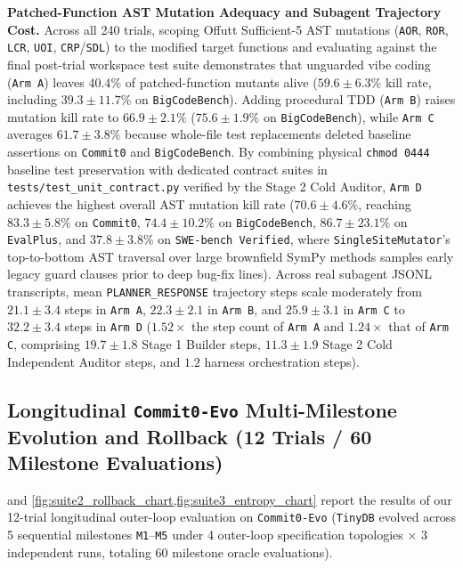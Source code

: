 \documentclass[11pt,a4paper,copyright]{google}
\begin{document}
\textbf{Patched-Function AST Mutation Adequacy and Subagent Trajectory Cost.} Across all 240 trials, scoping Offutt Sufficient-5 AST mutations (\texttt{AOR}, \texttt{ROR}, \texttt{LCR}, \texttt{UOI}, \texttt{CRP}/\texttt{SDL}) to the modified target functions and evaluating against the final post-trial workspace test suite demonstrates that unguarded vibe coding (\texttt{Arm A}) leaves $40.4\%$ of patched-function mutants alive ($59.6 \pm 6.3\%$ kill rate, including $39.3 \pm 11.7\%$ on \texttt{BigCodeBench}). Adding procedural TDD (\texttt{Arm B}) raises mutation kill rate to $66.9 \pm 2.1\%$ ($75.6 \pm 1.9\%$ on \texttt{BigCodeBench}), while \texttt{Arm C} averages $61.7 \pm 3.8\%$ because whole-file test replacements deleted baseline assertions on \texttt{Commit0} and \texttt{BigCodeBench}. By combining physical \texttt{chmod 0444} baseline test preservation with dedicated contract suites in \texttt{tests/\allowbreak test\_unit\_contract.py} verified by the Stage 2 Cold Auditor, \texttt{Arm D} achieves the highest overall AST mutation kill rate ($70.6 \pm 4.6\%$, reaching $83.3 \pm 5.8\%$ on \texttt{Commit0}, $74.4 \pm 10.2\%$ on \texttt{BigCodeBench}, $86.7 \pm 23.1\%$ on \texttt{EvalPlus}, and $37.8 \pm 3.8\%$ on \texttt{SWE-bench Verified}, where \texttt{SingleSiteMutator}'s top-to-bottom AST traversal over large brownfield SymPy methods samples early legacy guard clauses prior to deep bug-fix lines). Across real subagent JSONL transcripts, mean \texttt{PLANNER\_RESPONSE} trajectory steps scale moderately from $21.1 \pm 3.4$ steps in \texttt{Arm A}, $22.3 \pm 2.1$ in \texttt{Arm B}, and $25.9 \pm 3.1$ in \texttt{Arm C} to $32.2 \pm 3.4$ steps in \texttt{Arm D} ($1.52\times$ the step count of \texttt{Arm A} and $1.24\times$ that of \texttt{Arm C}, comprising $19.7 \pm 1.8$ Stage 1 Builder steps, $11.3 \pm 1.9$ Stage 2 Cold Independent Auditor steps, and $1.2$ harness orchestration steps).

\subsection{Longitudinal \texttt{Commit0-Evo} Multi-Milestone Evolution and Rollback (12 Trials / 60 Milestone Evaluations)}
\label{subsec:suite2_results}

 and \cref{fig:suite2_rollback_chart,fig:suite3_entropy_chart} report the results of our 12-trial longitudinal outer-loop evaluation on \texttt{Commit0-Evo} (\texttt{TinyDB} evolved across 5 sequential milestones \texttt{M1}--\texttt{M5} under 4 outer-loop specification topologies $\times$ 3 independent runs, totaling 60 milestone oracle evaluations).
\end{document}
